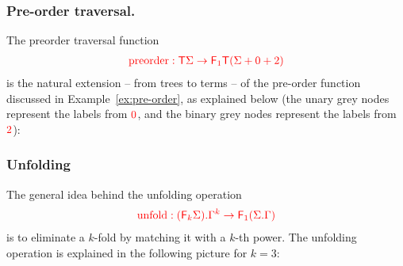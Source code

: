         \subsubsection{Pre-order traversal.} The preorder traversal function  
        \begin{align*}
            {\color{red}{{\color{red}{\mathrm{preorder}}}: {\color{red}{\mathsf T}}\Sigma \to {\color{red}{\mathsf F_{1}}}{\color{red}{\mathsf T}}({\color{red}{\Sigma}}+ 0 + 2)}}
        \end{align*}
        is the natural extension -- from trees to terms -- of the  pre-order function discussed in Example~\ref{ex:pre-order}, as explained below (the unary grey nodes represent the labels from ${\color{red}{0}}$, and the binary grey nodes represent the labels from ${\color{red}{2}}$):
        
\subsubsection{Unfolding}
The general idea behind the  unfolding operation 
\begin{align*}
{\color{red}{
    {\color{red}{\mathrm{unfold}}}: {\color{red}{({\color{red}{\mathsf F_{k}}}\Sigma) . \Gamma^k}} \to {\color{red}{\mathsf F_{1}}}({\color{red}{\Sigma . \Gamma}})
}}
\end{align*} 
is to eliminate a $k$-fold by matching it with a $k$-th power. 
The unfolding operation is explained in the following picture for $k=3$:

